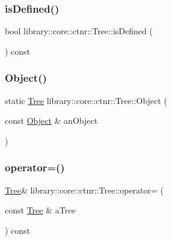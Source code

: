 \mbox{\label{classlibrary_1_1core_1_1ctnr_1_1_tree_a7fe044b38601503dca0f2720edead189}} 
\subsubsection{\texorpdfstring{isDefined()}{isDefined()}}
{\footnotesize\ttfamily bool library\+::core\+::ctnr\+::\+Tree\+::is\+Defined (\begin{DoxyParamCaption}{ }\end{DoxyParamCaption}) const}

\mbox{\label{classlibrary_1_1core_1_1ctnr_1_1_tree_a5e90e14573c52b7f00233200c76e9e82}} 
\subsubsection{\texorpdfstring{Object()}{Object()}}
{\footnotesize\ttfamily static \mbox{\hyperlink{classlibrary_1_1core_1_1ctnr_1_1_tree}{Tree}} library\+::core\+::ctnr\+::\+Tree\+::\+Object (\begin{DoxyParamCaption}\item[{const \mbox{\hyperlink{classlibrary_1_1core_1_1ctnr_1_1_object}{Object}} \&}]{an\+Object }\end{DoxyParamCaption})\hspace{0.3cm}{\ttfamily [static]}}

\mbox{\label{classlibrary_1_1core_1_1ctnr_1_1_tree_a5cc9a5ca245a3d9419caf9f1cd748c9d}} 
\subsubsection{\texorpdfstring{operator=()}{operator=()}}
{\footnotesize\ttfamily \mbox{\hyperlink{classlibrary_1_1core_1_1ctnr_1_1_tree}{Tree}}\& library\+::core\+::ctnr\+::\+Tree\+::operator= (\begin{DoxyParamCaption}\item[{const \mbox{\hyperlink{classlibrary_1_1core_1_1ctnr_1_1_tree}{Tree}} \&}]{a\+Tree }\end{DoxyParamCaption}) const}



